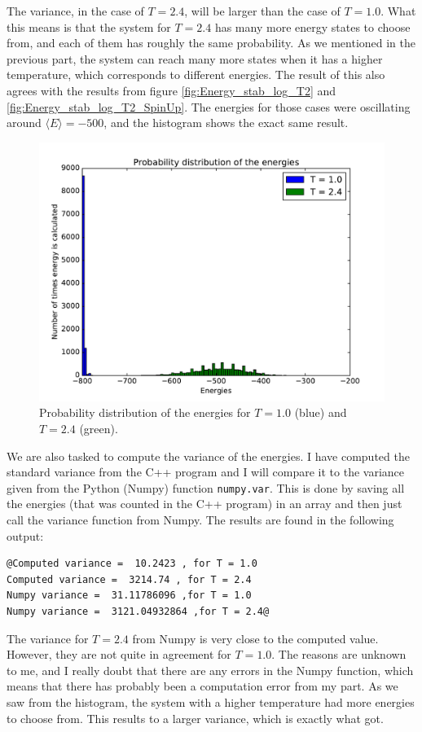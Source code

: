 \documentclass[12pt]{article}
\begin{document}
The variance, in the case of $T=2.4$, will be larger than the case of $T=1.0$. What this means is that the system for $T=2.4$ has many more energy states to choose from, and each of them has roughly the same probability. As we mentioned in the previous part, the system can reach many more states when it has a higher temperature, which corresponds to different energies. The result of this also agrees with the results from figure \ref{fig:Energy_stab_log_T2} and \ref{fig:Energy_stab_log_T2_SpinUp}. The energies for those cases were oscillating around $\langle E \rangle = -500$, and the histogram shows the exact same result.
\begin{figure}[H]
\centering
\includegraphics[width=\linewidth]{Plots/Probability_distribution_merged.pdf}
\caption{Probability distribution of the energies for $T=1.0$ (blue) and $T=2.4$ (green).}
\label{fig:prob_dist_merged}
\end{figure}
We are also tasked to compute the variance of the energies. I have computed the standard variance from the C++ program and I will compare it to the variance given from the Python (Numpy) function \texttt{numpy.var}. This is done by saving all the energies (that was counted in the C++ program) in an array and then just call the variance function from Numpy. The results are found in the following output:
\begin{lstlisting}
@Computed variance =  10.2423 , for T = 1.0
Computed variance =  3214.74 , for T = 2.4
Numpy variance =  31.11786096 ,for T = 1.0
Numpy variance =  3121.04932864 ,for T = 2.4@
\end{lstlisting}
The variance for $T=2.4$ from Numpy is very close to the computed value. However, they are not quite in agreement for $T=1.0$. The reasons are unknown to me, and I really doubt that there are any errors in the Numpy function, which means that there has probably been a computation error from my part. As we saw from the histogram, the system with a higher temperature had more energies to choose from. This results to a larger variance, which is exactly what got.
\FloatBarrier
\end{document}
